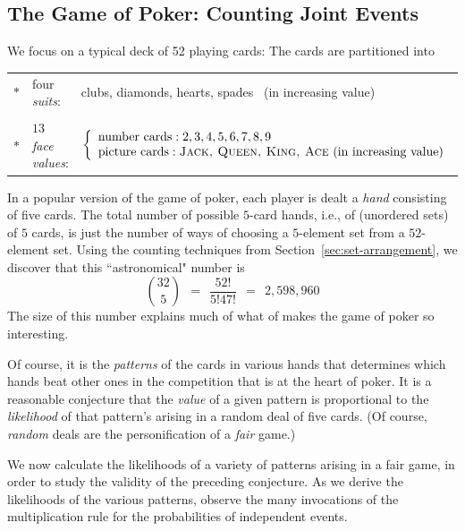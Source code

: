 \subsection{The Game of Poker: Counting Joint Events}

We focus on a typical deck of 52 playing cards: The cards are partitioned into

\medskip

\noindent
\begin{tabular}{cll}
$*$ &
four {\em suits}:  & {\sc clubs}, {\sc diamonds}, {\sc hearts}, {\sc spades} \ (in increasing value) \\
  \\
$*$ &
$13$ {\em face values}: &
$\displaystyle \left\{
\begin{array}{l}
\mbox{number cards}: 
2, 3, 4, 5, 6, 7, 8, 9 \\
\mbox{picture cards}: 
\mbox{{\sc Jack, Queen, King, Ace}  (in increasing value)}
\end{array}
\right.$ 
\end{tabular} 

\medskip

\noindent
In a popular version of the game of poker, each player is dealt a {\it hand} consisting of five cards.
The total number of possible $5$-card hands, i.e., of (unordered sets) of $5$ cards, is just the number
of ways of choosing a $5$-element set from a $52$-element set.  Using the counting techniques from
Section~\ref{sec:set-arrangement}, we discover that this ``astronomical" number is
\[
{32 \choose 5} \ \ = \ \ \frac{52!}{5! 47!} \ \ = \ \ 2,598,960 
\]
The size of this number explains much of what of makes the game of poker so interesting.

\medskip

Of course, it is the {\em patterns} of the cards in various hands that determines which hands
beat other ones in the competition that is at the heart of poker.  It is a reasonable
conjecture that the {\em value} of a given pattern is proportional to the {\em likelihood}
of that pattern's arising in a random deal of five cards.  (Of course, {\em random} deals are 
the personification of a {\em fair} game.)

We now calculate the likelihoods of a variety of patterns arising in a fair game, in order to study
the validity of the preceding conjecture.  As we derive the likelihoods of the various patterns,
observe the many invocations of the multiplication rule for the probabilities of independent events.

